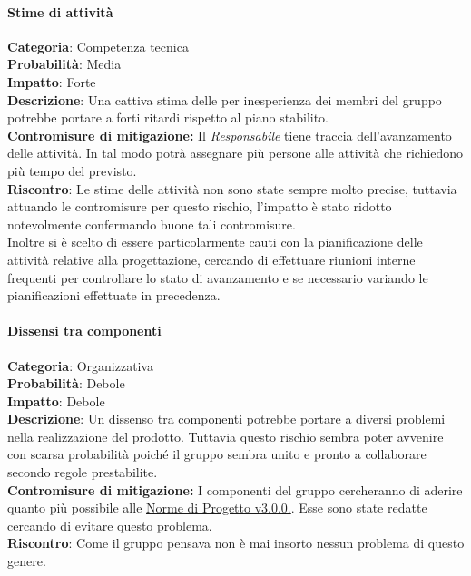 \documentclass{scalatekids-article}
\begin{document}
\paragraph{Stime di attività}
\textbf{Categoria}: Competenza tecnica\\
\textbf{Probabilità}: Media\\
\textbf{Impatto}: Forte\\
\textbf{Descrizione}: Una cattiva stima delle  per inesperienza dei membri del gruppo potrebbe portare a forti ritardi rispetto al piano stabilito.\\
\textbf{Contromisure di mitigazione:} Il \textit{Responsabile} tiene traccia dell'avanzamento delle attività. In tal modo potrà assegnare più persone alle attività che richiedono più tempo del previsto.\\
\textbf{Riscontro}:
Le stime delle attività non sono state sempre molto precise, tuttavia attuando le contromisure per questo rischio, l'impatto è stato ridotto notevolmente confermando buone tali contromisure.\\ Inoltre si è scelto di essere particolarmente cauti con la pianificazione delle attività relative alla progettazione, cercando di effettuare riunioni interne frequenti per controllare lo stato di avanzamento e se necessario variando le pianificazioni effettuate in precedenza.

\paragraph{Dissensi tra componenti}
\textbf{Categoria}: Organizzativa\\
\textbf{Probabilità}: Debole\\
\textbf{Impatto}: Debole\\
\textbf{Descrizione}: Un dissenso tra componenti potrebbe portare a diversi problemi nella realizzazione del prodotto. Tuttavia questo rischio sembra poter avvenire con scarsa probabilità poiché il gruppo sembra unito e pronto a collaborare secondo regole prestabilite.\\
\textbf{Contromisure di mitigazione:} I componenti del gruppo cercheranno di aderire quanto più possibile alle \href{run:../Interni/NormeDiProgetto\_v3.0.0.pdf}{Norme di Progetto v3.0.0.}. Esse sono state redatte cercando di evitare questo problema.\\
\textbf{Riscontro}: Come il gruppo pensava non è mai insorto nessun problema di questo genere.\\
\end{document}
